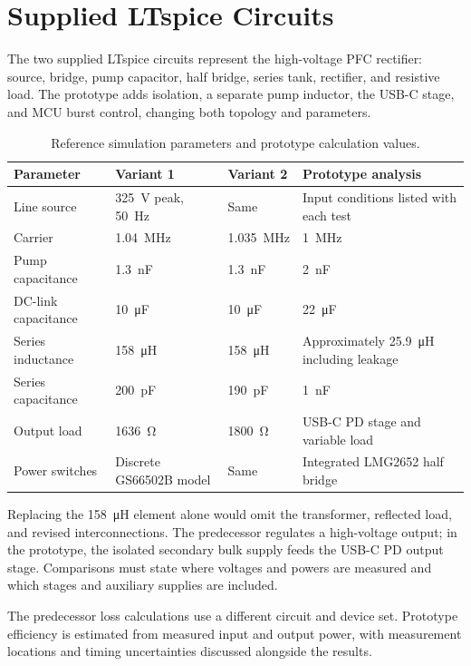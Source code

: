 \section{Supplied LTspice Circuits}
\label{sec:sim-files}

The two supplied LTspice circuits represent the high-voltage PFC rectifier: source, bridge, pump capacitor, half bridge, series tank, rectifier, and resistive load. The prototype adds isolation, a separate pump inductor, the USB-C stage, and MCU burst control, changing both topology and parameters.

\begin{table}[H]
\centering
\caption{Reference simulation parameters and prototype calculation values.}
\label{tab:sim-reference-passives}
\begin{tabularx}{\textwidth}{@{}L{0.26\textwidth}L{0.19\textwidth}L{0.19\textwidth}Y@{}}
\toprule
Parameter & Variant 1 & Variant 2 & Prototype analysis\\
\midrule
Line source & \SI{325}{\volt} peak, \SI{50}{\hertz} & Same & Input conditions listed with each test\\
Carrier & \SI{1.04}{\mega\hertz} & \SI{1.035}{\mega\hertz} & \SI{1}{\mega\hertz}\\
Pump capacitance & \SI{1.3}{\nano\farad} & \SI{1.3}{\nano\farad} & \SI{2}{\nano\farad}\\
DC-link capacitance & \SI{10}{\micro\farad} & \SI{10}{\micro\farad} & \SI{22}{\micro\farad}\\
Series inductance & \SI{158}{\micro\henry} & \SI{158}{\micro\henry} & Approximately \SI{25.9}{\micro\henry} including leakage\\
Series capacitance & \SI{200}{\pico\farad} & \SI{190}{\pico\farad} & \SI{1}{\nano\farad}\\
Output load & \SI{1636}{\ohm} & \SI{1800}{\ohm} & USB-C PD stage and variable load\\
Power switches & Discrete GS66502B model & Same & Integrated LMG2652 half bridge\\
\bottomrule
\end{tabularx}
\end{table}

Replacing the \SI{158}{\micro\henry} element alone would omit the transformer, reflected load, and revised interconnections. The predecessor regulates a high-voltage output; in the prototype, the isolated secondary bulk supply feeds the USB-C PD output stage. Comparisons must state where voltages and powers are measured and which stages and auxiliary supplies are included.

The predecessor loss calculations use a different circuit and device set. Prototype efficiency is estimated from measured input and output power, with measurement locations and timing uncertainties discussed alongside the results.
